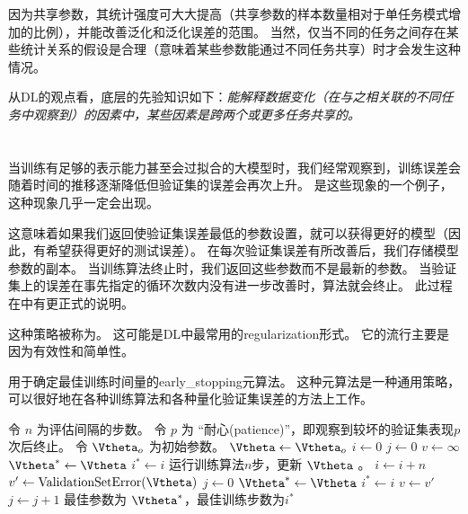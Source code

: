 因为共享参数，其统计强度可大大提高（共享参数的样本数量相对于单任务模式增加的比例），并能改善泛化和泛化误差的范围\citep{Baxter-1995}。
当然，仅当不同的任务之间存在某些统计关系的假设是合理（意味着某些参数能通过不同任务共享）时才会发生这种情况。

从\gls{DL}的观点看，底层的先验知识如下：\emph{能解释数据变化（在与之相关联的不同任务中观察到）的因素中，某些因素是跨两个或更多任务共享的。}


\section{}
\label{sec:early_stopping}
当训练有足够的表示能力甚至会过拟合的大模型时，我们经常观察到，训练误差会随着时间的推移逐渐降低但验证集的误差会再次上升。
是这些现象的一个例子，这种现象几乎一定会出现。

这意味着如果我们返回使验证集误差最低的参数设置，就可以获得更好的模型（因此，有希望获得更好的测试误差）。
在每次验证集误差有所改善后，我们存储模型参数的副本。
当训练算法终止时，我们返回这些参数而不是最新的参数。
当验证集上的误差在事先指定的循环次数内没有进一步改善时，算法就会终止。
此过程在中有更正式的说明。



这种策略被称为。
这可能是\gls{DL}中最常用的\gls{regularization}形式。
它的流行主要是因为有效性和简单性。

\begin{algorithm}[ht]
\caption{用于确定最佳训练时间量的\gls{early_stopping}元算法。
这种元算法是一种通用策略，可以很好地在各种训练算法和各种量化验证集误差的方法上工作。
}
\label{alg:early_stopping}
\begin{algorithmic}
\STATE 令 $n$ 为评估间隔的步数。
\STATE 令 $p$ 为 ``耐心(patience)''，即观察到较坏的验证集表现$p$次后终止。 
\STATE 令 $\Vtheta_{o}$ 为初始参数。
\STATE $\Vtheta \leftarrow \Vtheta_{o}$
\STATE $i \leftarrow 0$
\STATE $j \leftarrow 0$
\STATE $v \leftarrow \infty$
\STATE $\Vtheta^* \leftarrow \Vtheta$
\STATE $i^* \leftarrow i$
    \STATE 运行训练算法$n$步，更新 $\Vtheta$ 。
    \STATE $i \leftarrow i + n$
    \STATE $v' \leftarrow \text{ValidationSetError}(\Vtheta)$
        \STATE $j \leftarrow 0$
        \STATE $\Vtheta^* \leftarrow \Vtheta$
        \STATE $i^* \leftarrow i$
        \STATE $v \leftarrow v'$
    \ELSE
        \STATE $j \leftarrow j + 1$
    \ENDIF
\ENDWHILE
\STATE 最佳参数为 $\Vtheta^*$，最佳训练步数为$i^*$
\end{algorithmic}
\end{algorithm}



